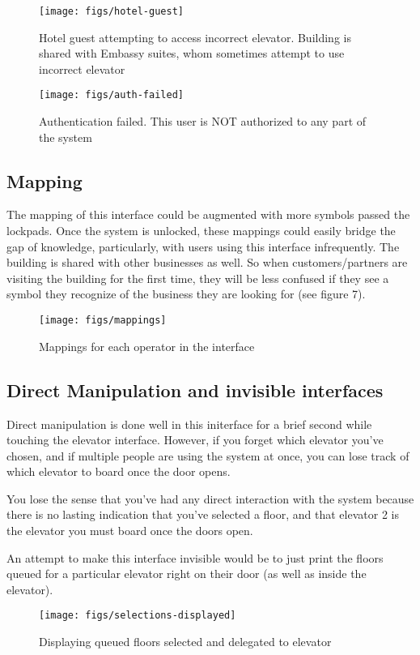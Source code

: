 \begin{figure}[H]
  \centering
  \texttt{[image: figs/hotel-guest]}
  \caption{Hotel guest attempting to access incorrect elevator. Building is shared with Embassy suites, whom sometimes attempt to use incorrect elevator}
  \label{fig::1}
\end{figure}

\begin{figure}[H]
  \centering
  \texttt{[image: figs/auth-failed]}
  \caption{Authentication failed. This user is NOT authorized to any part of the system}
  \label{fig::1}
\end{figure}

\subsection{Mapping}
The mapping of this interface could be augmented with more symbols passed the lockpads. Once the system is unlocked, these mappings could easily bridge the gap of knowledge, particularly, with users using this interface infrequently. The building is shared with other businesses as well. So when customers/partners are visiting the building for the first time, they will be less confused if they see a symbol they recognize of the business they are looking for (see figure 7).

\begin{figure}[H]
  \centering
  \texttt{[image: figs/mappings]}
  \caption{Mappings for each operator in the interface}
  \label{fig::1}
\end{figure}

\subsection{Direct Manipulation and invisible interfaces}
Direct manipulation is done well in this initerface for a brief second while touching the elevator interface. However, if you forget which elevator you've chosen, and if multiple people are using the system at once, you can lose track of which elevator to board once the door opens.

You lose the sense that you've had any direct interaction with the system because there is no lasting indication that you've selected a floor, and that elevator 2 is the elevator you must board once the doors open.

An attempt to make this interface invisible would be to just print the floors queued for a particular elevator right on their door (as well as inside the elevator).

\begin{figure}[H]
  \centering
  \texttt{[image: figs/selections-displayed]}
  \caption{Displaying queued floors selected and delegated to elevator}
  \label{fig::1}
\end{figure}



